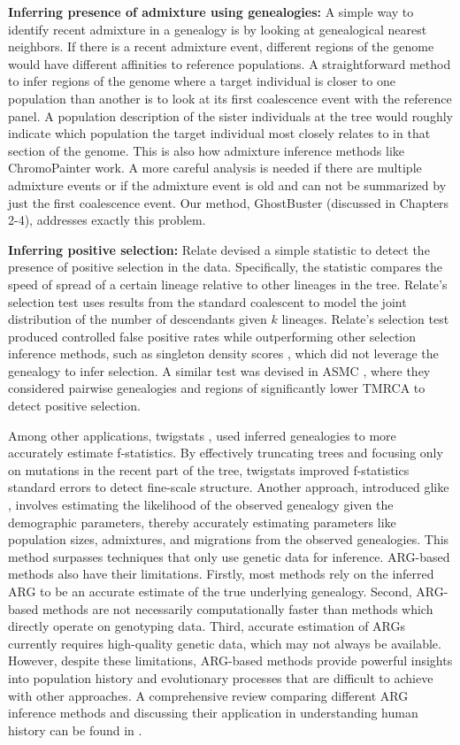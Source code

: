\textbf{Inferring presence of admixture using genealogies:} A simple way to identify recent admixture in a genealogy is by looking at genealogical nearest neighbors. If there is a recent admixture event, different regions of the genome would have different affinities to reference populations. A straightforward method to infer regions of the genome where a target individual is closer to one population than another is to look at its first coalescence event with the reference panel. A population description of the sister individuals at the tree would roughly indicate which population the target individual most closely relates to in that section of the genome. This is also how admixture inference methods like ChromoPainter work. A more careful analysis is needed if there are multiple admixture events or if the admixture event is old and can not be summarized by just the first coalescence event. Our method, GhostBuster (discussed in Chapters 2-4), addresses exactly this problem.

\textbf{Inferring positive selection:} Relate \cite{speidel2024high} devised a simple statistic to detect the presence of positive selection in the data. Specifically, the statistic compares the speed of spread of a certain lineage relative to other lineages in the tree. Relate's selection test uses results from the standard coalescent to model the joint distribution of the number of descendants given \(k\) lineages. Relate's selection test produced controlled false positive rates while outperforming other selection inference methods, such as singleton density scores \cite{field2016detection}, which did not leverage the genealogy to infer selection. A similar test was devised in ASMC \cite{palamara2018high}, where they considered pairwise genealogies and regions of significantly lower TMRCA to detect positive selection.

Among other applications, twigstats \cite{speidel2024high}, used inferred genealogies to more accurately estimate f-statistics. By effectively truncating trees and focusing only on mutations in the recent part of the tree, twigstats improved f-statistics standard errors to detect fine-scale structure. Another approach, introduced glike \cite{fan2023likelihood}, involves estimating the likelihood of the observed genealogy given the demographic parameters, thereby accurately estimating parameters like population sizes, admixtures, and migrations from the observed genealogies. This method surpasses techniques that only use genetic data for inference. ARG-based methods also have their limitations. Firstly, most methods rely on the inferred ARG to be an accurate estimate of the true underlying genealogy. Second, ARG-based methods are not necessarily computationally faster than methods which directly operate on genotyping data. Third, accurate estimation of ARGs currently requires high-quality genetic data, which may not always be available. However, despite these limitations, ARG-based methods provide powerful insights into population history and evolutionary processes that are difficult to achieve with other approaches. A comprehensive review comparing different ARG inference methods and discussing their application in understanding human history can be found in \cite{brandt2024promise}.

